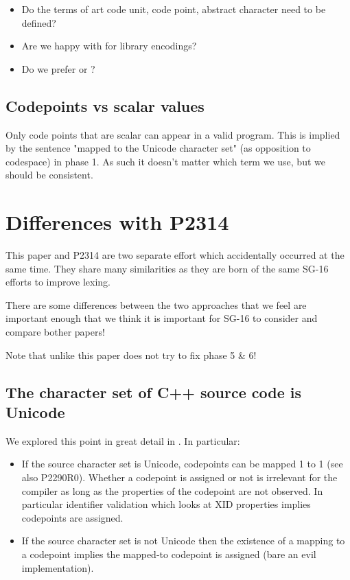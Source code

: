 \documentclass{wg21}
\begin{document}
\begin{itemize}
    \item Do the terms of art code unit, code point, abstract character need to be defined?
    \item Are we happy with  for library encodings?
    \item Do we prefer  or  ?
\end{itemize}

\subsection{Codepoints vs scalar values}

Only code points that are scalar can appear in a valid program.
This is implied by the sentence "mapped to the Unicode character set" (as opposition to codespace) in phase 1.
As such it doesn't matter which term we use, but we should be consistent.

\section{Differences with P2314}

This paper and P2314 are two separate effort which accidentally occurred at the same time.
They share many similarities as they are born of the same SG-16 efforts to improve lexing.

There are some differences between the two approaches that we feel are important enough that
we think it is important for SG-16 to consider and compare bother papers!

Note that unlike  this paper does not try to fix phase 5 \& 6!

\subsection{The character set of C++ source code is Unicode}

We explored this point in great detail in .
In particular:
\begin{itemize}
    \item If the source character set is Unicode, codepoints can be mapped 1 to 1 (see also P2290R0).
    Whether a codepoint is assigned or not is irrelevant for the compiler as long as the properties of the codepoint are not observed.
    In particular identifier validation which looks at XID properties implies codepoints are assigned.

    \item If the source character set is not Unicode then the existence of a mapping to a codepoint implies the mapped-to codepoint is assigned (bare an evil implementation).
\end{itemize}
\end{document}
